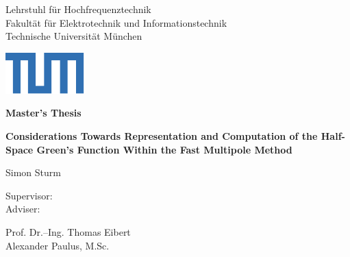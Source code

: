 \begin{titlepage}
	

	\newcommand{\UniversitaetLogoBreite}{19mm}
	\newcommand{\UniversitaetLogoHoehe}{1cm}

	\linespread{1}	
	\vspace*{-1cm}
    
	\setlength{\parindent}{0cm} 
	\begin{center}
		\begin{minipage}[l]{\textwidth-\UniversitaetLogoBreite}
			{ \footnotesize \color{TUMBlau}
				{\selectfont \small
					\textsf{Lehrstuhl für Hochfrequenztechnik\\
					Fakultät für Elektrotechnik und Informationstechnik\\
					Technische Universität München}\par}
			}
		\end{minipage}%
		\begin{minipage}[r]{\UniversitaetLogoBreite} %
			\includegraphics[width=\textwidth]{./titlepage/TUM_Logo_Web.pdf}
		\end{minipage}%
	\end{center}%
		
	\vspace{5cm}
	\Huge
	\textbf{Master's Thesis}
	\vspace{1.5cm}
	\LARGE
	\begin{flushleft}	
		\textbf{Considerations Towards Representation and Computation
		of the Half-Space Green's Function Within the Fast Multipole Method}
	\end{flushleft}
	\vspace{1cm}
	Simon Sturm 
	\qquad \qquad
	\\
	[3cm] 
	\large	
	\parbox[b][3cm][t]{2.2cm}{
		Supervisor: \\
	    Adviser: }
	\parbox[b][3cm][t]{6cm}{
		Prof. Dr.--Ing. Thomas Eibert\\
		Alexander Paulus, M.Sc.
		}				

\end{titlepage}	 
